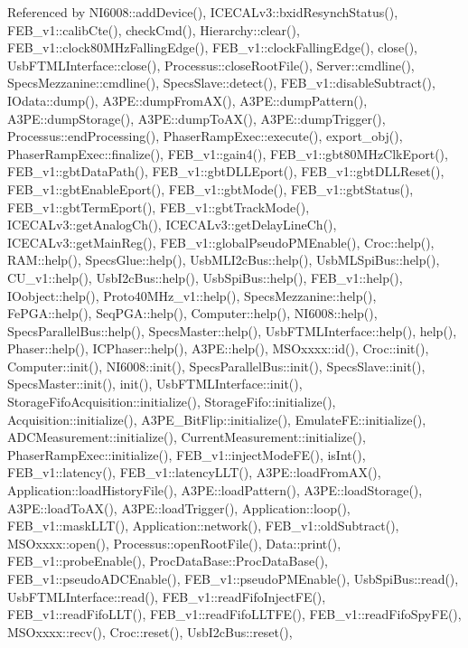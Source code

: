 Referenced by N\+I6008\+::add\+Device(), I\+C\+E\+C\+A\+Lv3\+::bxid\+Resynch\+Status(), F\+E\+B\+\_\+v1\+::calib\+Cte(), check\+Cmd(), Hierarchy\+::clear(), F\+E\+B\+\_\+v1\+::clock80\+M\+Hz\+Falling\+Edge(), F\+E\+B\+\_\+v1\+::clock\+Falling\+Edge(), close(), Usb\+F\+T\+M\+L\+Interface\+::close(), Processus\+::close\+Root\+File(), Server\+::cmdline(), Specs\+Mezzanine\+::cmdline(), Specs\+Slave\+::detect(), F\+E\+B\+\_\+v1\+::disable\+Subtract(), I\+Odata\+::dump(), A3\+P\+E\+::dump\+From\+A\+X(), A3\+P\+E\+::dump\+Pattern(), A3\+P\+E\+::dump\+Storage(), A3\+P\+E\+::dump\+To\+A\+X(), A3\+P\+E\+::dump\+Trigger(), Processus\+::end\+Processing(), Phaser\+Ramp\+Exec\+::execute(), export\+\_\+obj(), Phaser\+Ramp\+Exec\+::finalize(), F\+E\+B\+\_\+v1\+::gain4(), F\+E\+B\+\_\+v1\+::gbt80\+M\+Hz\+Clk\+Eport(), F\+E\+B\+\_\+v1\+::gbt\+Data\+Path(), F\+E\+B\+\_\+v1\+::gbt\+D\+L\+L\+Eport(), F\+E\+B\+\_\+v1\+::gbt\+D\+L\+L\+Reset(), F\+E\+B\+\_\+v1\+::gbt\+Enable\+Eport(), F\+E\+B\+\_\+v1\+::gbt\+Mode(), F\+E\+B\+\_\+v1\+::gbt\+Status(), F\+E\+B\+\_\+v1\+::gbt\+Term\+Eport(), F\+E\+B\+\_\+v1\+::gbt\+Track\+Mode(), I\+C\+E\+C\+A\+Lv3\+::get\+Analog\+Ch(), I\+C\+E\+C\+A\+Lv3\+::get\+Delay\+Line\+Ch(), I\+C\+E\+C\+A\+Lv3\+::get\+Main\+Reg(), F\+E\+B\+\_\+v1\+::global\+Pseudo\+P\+M\+Enable(), Croc\+::help(), R\+A\+M\+::help(), Specs\+Glue\+::help(), Usb\+M\+L\+I2c\+Bus\+::help(), Usb\+M\+L\+Spi\+Bus\+::help(), C\+U\+\_\+v1\+::help(), Usb\+I2c\+Bus\+::help(), Usb\+Spi\+Bus\+::help(), F\+E\+B\+\_\+v1\+::help(), I\+Oobject\+::help(), Proto40\+M\+Hz\+\_\+v1\+::help(), Specs\+Mezzanine\+::help(), Fe\+P\+G\+A\+::help(), Seq\+P\+G\+A\+::help(), Computer\+::help(), N\+I6008\+::help(), Specs\+Parallel\+Bus\+::help(), Specs\+Master\+::help(), Usb\+F\+T\+M\+L\+Interface\+::help(), help(), Phaser\+::help(), I\+C\+Phaser\+::help(), A3\+P\+E\+::help(), M\+S\+Oxxxx\+::id(), Croc\+::init(), Computer\+::init(), N\+I6008\+::init(), Specs\+Parallel\+Bus\+::init(), Specs\+Slave\+::init(), Specs\+Master\+::init(), init(), Usb\+F\+T\+M\+L\+Interface\+::init(), Storage\+Fifo\+Acquisition\+::initialize(), Storage\+Fifo\+::initialize(), Acquisition\+::initialize(), A3\+P\+E\+\_\+\+Bit\+Flip\+::initialize(), Emulate\+F\+E\+::initialize(), A\+D\+C\+Measurement\+::initialize(), Current\+Measurement\+::initialize(), Phaser\+Ramp\+Exec\+::initialize(), F\+E\+B\+\_\+v1\+::inject\+Mode\+F\+E(), is\+Int(), F\+E\+B\+\_\+v1\+::latency(), F\+E\+B\+\_\+v1\+::latency\+L\+L\+T(), A3\+P\+E\+::load\+From\+A\+X(), Application\+::load\+History\+File(), A3\+P\+E\+::load\+Pattern(), A3\+P\+E\+::load\+Storage(), A3\+P\+E\+::load\+To\+A\+X(), A3\+P\+E\+::load\+Trigger(), Application\+::loop(), F\+E\+B\+\_\+v1\+::mask\+L\+L\+T(), Application\+::network(), F\+E\+B\+\_\+v1\+::old\+Subtract(), M\+S\+Oxxxx\+::open(), Processus\+::open\+Root\+File(), Data\+::print(), F\+E\+B\+\_\+v1\+::probe\+Enable(), Proc\+Data\+Base\+::\+Proc\+Data\+Base(), F\+E\+B\+\_\+v1\+::pseudo\+A\+D\+C\+Enable(), F\+E\+B\+\_\+v1\+::pseudo\+P\+M\+Enable(), Usb\+Spi\+Bus\+::read(), Usb\+F\+T\+M\+L\+Interface\+::read(), F\+E\+B\+\_\+v1\+::read\+Fifo\+Inject\+F\+E(), F\+E\+B\+\_\+v1\+::read\+Fifo\+L\+L\+T(), F\+E\+B\+\_\+v1\+::read\+Fifo\+L\+L\+T\+F\+E(), F\+E\+B\+\_\+v1\+::read\+Fifo\+Spy\+F\+E(), M\+S\+Oxxxx\+::recv(), Croc\+::reset(), Usb\+I2c\+Bus\+::reset(), 